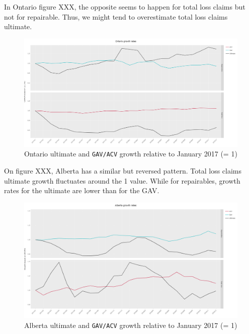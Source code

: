 	In Ontario figure XXX, the opposite seems to happen for total loss claims but not for repairable. Thus, we might tend to overestimate total loss claims ultimate.
	\begin{figure}[H]
		\begin{center}
			\includegraphics[scale=0.2]{Graphiques/ON_growth} 
			\renewcommand{\figurename}{Figure}
			\caption{Ontario ultimate and \texttt{GAV/ACV} growth relative to January 2017 (= 1)}\label{Fig_ON_growth}
		\end{center}
	\end{figure}
	On figure XXX, Alberta has a similar but reversed pattern. Total loss claims ultimate growth fluctuates around the 1 value. While for repairables, growth rates for the ultimate are lower than for the GAV.  
	\begin{figure}[H]
		\begin{center}
			\includegraphics[scale=0.2]{Graphiques/AB_growth} 
			\renewcommand{\figurename}{Figure}
			\caption{Alberta ultimate and \texttt{GAV/ACV} growth relative to January 2017 (= 1)}\label{Fig_AB_growth}
		\end{center}
	\end{figure}
	
